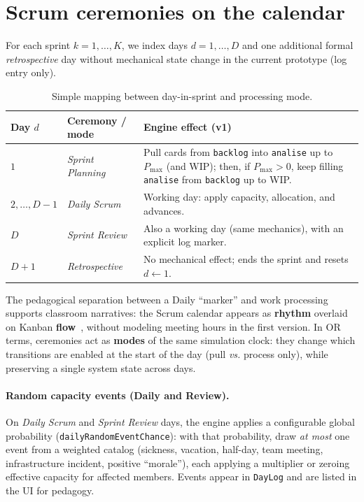 \section{Scrum ceremonies on the calendar}
\label{sec:ritos}

For each sprint $k=1,\dots,K$, we index days $d=1,\dots,D$ and one additional formal \emph{retrospective} day without mechanical state change in the current prototype (log entry only).

\begin{table}[htbp]
  \centering
  \caption{Simple mapping between day-in-sprint and processing mode.}
  \label{tab:ritos}
  \begin{tabular}{@{}llp{7.2cm}@{}}
    \toprule
    Day $d$ & Ceremony / mode & Engine effect (v1) \\
    \midrule
    $1$ & \emph{Sprint Planning} & Pull cards from \texttt{backlog} into \texttt{analise} up to $P_{\max}$ (and WIP); then, if $P_{\max}>0$, keep filling \texttt{analise} from \texttt{backlog} up to WIP. \\
    $2,\dots,D-1$ & \emph{Daily Scrum} & Working day: apply capacity, allocation, and advances. \\
    $D$ & \emph{Sprint Review} & Also a working day (same mechanics), with an explicit log marker. \\
    $D{+}1$ & \emph{Retrospective} & No mechanical effect; ends the sprint and resets $d\leftarrow 1$. \\
    \bottomrule
  \end{tabular}
\end{table}

The pedagogical separation between a Daily ``marker'' and work processing supports classroom narratives: the Scrum calendar appears as \textbf{rhythm} overlaid on Kanban \textbf{flow}~\cite{schwaber2002agile}, without modeling meeting hours in the first version. In OR terms, ceremonies act as \textbf{modes} of the same simulation clock: they change which transitions are enabled at the start of the day (pull \emph{vs.} process only), while preserving a single system state across days.

\paragraph{Random capacity events (Daily and Review).}
On \emph{Daily Scrum} and \emph{Sprint Review} days, the engine applies a configurable global probability (\texttt{dailyRandomEventChance}): with that probability, draw \emph{at most} one event from a weighted catalog (sickness, vacation, half-day, team meeting, infrastructure incident, positive ``morale''), each applying a multiplier or zeroing effective capacity for affected members. Events appear in \texttt{DayLog} and are listed in the UI for pedagogy.
